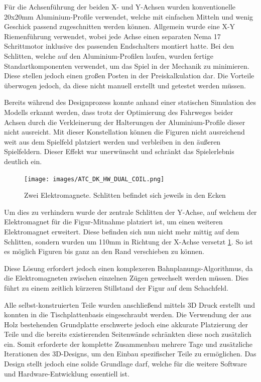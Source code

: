 Für die Achsenführung der beiden X- und Y-Achsen wurden konventionelle
20x20mm Aluminium-Profile verwendet, welche mit einfachen Mitteln und
wenig Geschick passend zugeschnitten werden können. Allgemein wurde eine
X-Y Riemenführung verwendet, wobei jede Achse einen separaten Nema 17
Schrittmotor inklusive des passenden Endschalters montiert hatte. Bei
den Schlitten, welche auf den Aluminium-Profilen laufen, wurden fertige
Standartkomponenten verwendet, um das Spiel in der Mechanik zu
minimieren. Diese stellen jedoch einen großen Posten in der
Preiskalkulation dar. Die Vorteile überwogen jedoch, da diese nicht
manuell erstellt und getestet werden müssen.

Bereits während des Designprozess konnte anhand einer statischen
Simulation des Modells erkannt werden, dass trotz der Optimierung des
Fahrweges beider Achsen durch die Verkleinerung der Halterungen der
Aluminium-Profile dieser nicht ausreicht. Mit dieser Konstellation
können die Figuren nicht ausreichend weit aus dem Spielfeld platziert
werden und verbleiben in den äußeren Spielfeldern. Dieser Effekt war
unerwünscht und schränkt das Spielerlebnis deutlich ein.

\begin{figure}
\centering
\texttt{[image: images/ATC\_DK\_HW\_DUAL\_COIL.png]}
\caption{Zwei Elektromagnete. Schlitten befindet sich jeweils in den
Ecken \label{ATC_DK_HW_DUAL_COIL}}
\end{figure}

Um dies zu verhindern wurde der zentrale Schlitten der Y-Achse, auf
welchem der Elektromagnet für die Figur-Mitnahme platziert ist, um einen
weiteren Elektromagnet erweitert. Diese befinden sich nun nicht mehr
mittig auf dem Schlitten, sondern wurden um 110mm in Richtung der
X-Achse versetzt \ref{ATC_DK_HW_DUAL_COIL}. So ist es möglich Figuren
bis ganz an den Rand verschieben zu können.

Diese Lösung erfordert jedoch einen komplexeren
Bahnplanungs-Algorithmus, da die Elektromagneten zwischen einzelnen
Zügen gewechselt werden müssen. Dies führt zu einem zeitlich kürzeren
Stillstand der Figur auf dem Schachfeld.

Alle selbst-konstruierten Teile wurden anschließend mittels 3D Druck
erstellt und konnten in die Tischplattenbasis eingeschraubt werden. Die
Verwendung der aus Holz bestehenden Grundplatte erschwerte jedoch eine
akkurate Platzierung der Teile und die bereits existierenden Seitenwände
schränkten diese noch zusätzlich ein. Somit erforderte der komplette
Zusammenbau mehrere Tage und zusätzliche Iterationen des 3D-Designs, um
den Einbau spezifischer Teile zu ermöglichen. Das Design stellt jedoch
eine solide Grundlage darf, welche für die weitere Software und
Hardware-Entwicklung essentiell ist.

